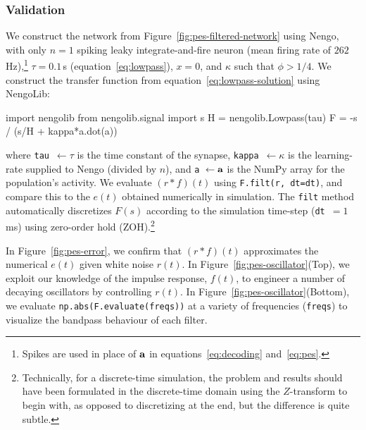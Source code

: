 \subsubsection{Validation}

We construct the network from Figure~\ref{fig:pes-filtered-network} using Nengo, with only $n = 1$ spiking leaky integrate-and-fire neuron (mean firing rate of $262\,$Hz),\footnote{%
Spikes are used in place of $\mathbf{a}$ in equations~\ref{eq:decoding} and~\ref{eq:pes}.} $\tau = 0.1\,$s (equation~\ref{eq:lowpass}), $x = 0$, and $\kappa$ such that $\phi > 1/4$.
We construct the transfer function from equation~\ref{eq:lowpass-solution} using NengoLib:
\begin{python}
import nengolib
from nengolib.signal import s
H = nengolib.Lowpass(tau)
F = -s / (s/H + kappa*a.dot(a))
\end{python}
where \texttt{tau}~$\leftarrow \tau$ is the time constant of the synapse, \texttt{kappa}~$\leftarrow \kappa$ is the learning-rate supplied to Nengo (divided by $n$), and \texttt{a}~$\leftarrow \mathbf{a}$ is the NumPy array for the population's activity.
We evaluate $(r \ast f)(t)$ using \texttt{F.filt(r, dt=dt)}, and compare this to the $e(t)$ obtained numerically in simulation.
The \texttt{filt} method automatically discretizes $F(s)$ according to the simulation time-step (\texttt{dt}~$= 1\,$ms) using zero-order hold (ZOH).\footnote{Technically, for a discrete-time simulation, the problem and results should have been formulated in the discrete-time domain using the $Z$-transform to begin with, as opposed to discretizing at the end, but the difference is quite subtle.}

In Figure~\ref{fig:pes-error}, we confirm that $(r \ast f)(t)$ approximates the numerical $e(t)$ given white noise $r(t)$.
In Figure~\ref{fig:pes-oscillator}(Top), we exploit our knowledge of the impulse response, $f(t)$, to engineer a number of decaying oscillators by controlling $r(t)$.
In Figure~\ref{fig:pes-oscillator}(Bottom), we evaluate \texttt{np.abs(F.evaluate(freqs))} at a variety of frequencies (\texttt{freqs}) to visualize the bandpass behaviour of each filter.


